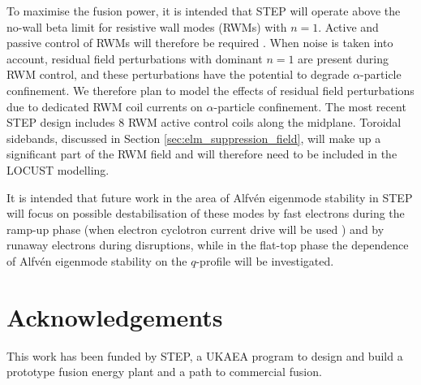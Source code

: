 \documentclass[10pt, a4paper, twoside]{article}
\begin{document}
To maximise the fusion power, it is intended that STEP will operate above the no-wall beta limit for resistive wall modes (RWMs) with $n=1$. Active and passive control of RWMs will therefore be required \cite{xia2023}. When noise is taken into account, residual field perturbations with dominant $n=1$ are present during RWM control, and these perturbations have the potential to degrade $\alpha$-particle confinement. We therefore plan to model the effects of residual field perturbations due to dedicated RWM coil currents on $\alpha$-particle confinement. The most recent STEP design includes 8 RWM active control coils along the midplane. Toroidal sidebands, discussed in Section \ref{sec:elm_suppression_field}, will make up a significant part of the RWM field and will therefore need to be included in the LOCUST modelling.

It is intended that future work in the area of Alfv\'en eigenmode stability in STEP will focus on possible destabilisation of these modes by fast electrons during the ramp-up phase (when electron cyclotron current drive will be used \cite{freethy2023}) and by runaway electrons during disruptions, while in the flat-top phase the dependence of Alfv\'en eigenmode stability on the $q$-profile will be investigated. 

\section*{Acknowledgements}

This work has been funded by STEP, a UKAEA program to design and build a prototype fusion energy plant and a path to commercial fusion.
\end{document}
